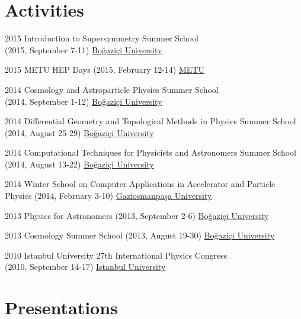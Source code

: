 \documentclass[]{friggeri-cv}
\begin{document}
\section{Activities}

\begin{entrylist}
		 	
	\entry
	{2015}
	{Introduction to Supersymmetry  Summer School \\ \normalfont (2015, September 7-11)}
	{\href{http://fezagursey.boun.edu.tr/?sayfa=29}{Boğaziçi University}}
	
	\entry
	{2015}
	{METU HEP Days  \normalfont (2015, February 12-14)}
	{\href{http://yef.ankara.edu.tr/yefgunleri2015/index.html}{METU}}
		
	\entry
	{2014}
	{Cosmology and Astroparticle Physics Summer School \\ \normalfont (2014, September 1-12)}
	{\href{http://fezagursey.boun.edu.tr/?sayfa=33}{Boğaziçi University}}
		
	\entry
	{2014}
	{Differential Geometry and Topological Methods in Physics Summer School  \normalfont (2014, August 25-29)}
	{\href{http://fezagursey.boun.edu.tr/?sayfa=32}{Boğaziçi University}}
		
	\entry
	{2014}
	{Computational Techniques for Physicists and Astronomers Summer School  \normalfont (2014, August 13-22)}
	{\href{http://fezagursey.boun.edu.tr/?sayfa=31}{Boğaziçi University}}
	
	\entry
	{2014}
	{Winter School on Computer Applications in Accelerator and Particle Physics \normalfont (2014, February 3-10)}
	{\href{http://hpfbu.web.cern.ch/hpfbu/HPFBU2014/HPFBU2014.html}{Gaziosmanpaşa University}}
		
	\entry
	{2013}
	{Physics for Astronomers \normalfont (2013, September 2-6)}
	{\href{http://fezagursey.boun.edu.tr/?sayfa=36}{Boğaziçi University}}
	
  	\entry
  	{2013}
    {Cosmology Summer School \normalfont (2013, August 19-30)}
    {\href{http://fezagursey.boun.edu.tr/?sayfa=35}{Boğaziçi University}}
    
    \entry
    {2010}
    {Istanbul University 27th International Physics  Congress \\ \normalfont (2010, September 14-17)}
    {\href{http://www.tfd.com.tr/arsiv/TFD/27/Wc9f53756aa549.htm}{Istanbul University}}

\end{entrylist}

\newpage

\section{Presentations}
\end{document}
